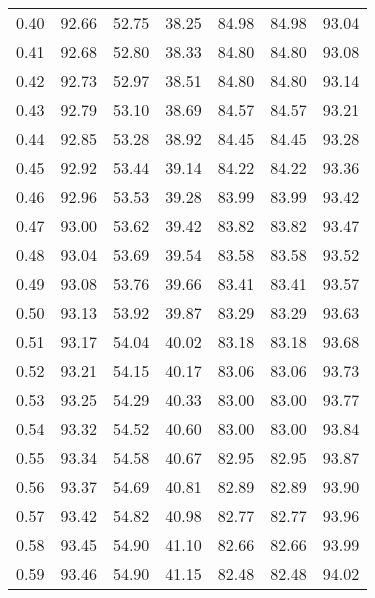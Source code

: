 \begin{tabular}{|c|c|c|c|c|c|c|}
      0.40 &     92.66 &     52.75 &      38.25 &   84.98 &      84.98 &         93.04 \\
      0.41 &     92.68 &     52.80 &      38.33 &   84.80 &      84.80 &         93.08 \\
      0.42 &     92.73 &     52.97 &      38.51 &   84.80 &      84.80 &         93.14 \\
      0.43 &     92.79 &     53.10 &      38.69 &   84.57 &      84.57 &         93.21 \\
      0.44 &     92.85 &     53.28 &      38.92 &   84.45 &      84.45 &         93.28 \\
      0.45 &     92.92 &     53.44 &      39.14 &   84.22 &      84.22 &         93.36 \\
      0.46 &     92.96 &     53.53 &      39.28 &   83.99 &      83.99 &         93.42 \\
      0.47 &     93.00 &     53.62 &      39.42 &   83.82 &      83.82 &         93.47 \\
      0.48 &     93.04 &     53.69 &      39.54 &   83.58 &      83.58 &         93.52 \\
      0.49 &     93.08 &     53.76 &      39.66 &   83.41 &      83.41 &         93.57 \\
      0.50 &     93.13 &     53.92 &      39.87 &   83.29 &      83.29 &         93.63 \\
      0.51 &     93.17 &     54.04 &      40.02 &   83.18 &      83.18 &         93.68 \\
      0.52 &     93.21 &     54.15 &      40.17 &   83.06 &      83.06 &         93.73 \\
      0.53 &     93.25 &     54.29 &      40.33 &   83.00 &      83.00 &         93.77 \\
      0.54 &     93.32 &     54.52 &      40.60 &   83.00 &      83.00 &         93.84 \\
      0.55 &     93.34 &     54.58 &      40.67 &   82.95 &      82.95 &         93.87 \\
      0.56 &     93.37 &     54.69 &      40.81 &   82.89 &      82.89 &         93.90 \\
      0.57 &     93.42 &     54.82 &      40.98 &   82.77 &      82.77 &         93.96 \\
      0.58 &     93.45 &     54.90 &      41.10 &   82.66 &      82.66 &         93.99 \\
      0.59 &     93.46 &     54.90 &      41.15 &   82.48 &      82.48 &         94.02 \\

\end{tabular}
